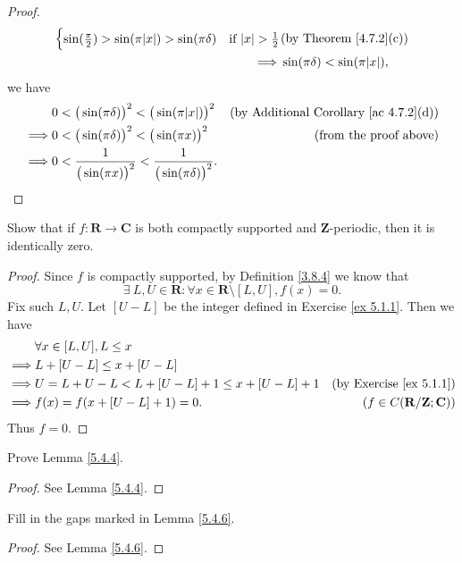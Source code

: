 \begin{proof}
\begin{align*}
\begin{cases}
                       \sin(\frac{\pi}{2}) > \sin(\pi \abs*{x}) > \sin(\pi \delta)    & \text{if } \abs*{x} > \frac{1}{2}    \\
                   \end{cases}    & \text{(by Theorem \ref{4.7.2}(c))}    \\
        \implies & \sin(\pi \delta) < \sin(\pi \abs*{x}),
    \end{align*}
    we have
    \begin{align*}
                 & 0 < \big(\sin(\pi \delta)\big)^2 < \big(\sin(\pi \abs*{x})\big)^2               & \text{(by Additional Corollary \ref{ac 4.7.2}(d))} \\
        \implies & 0 < \big(\sin(\pi \delta)\big)^2 < \big(\sin(\pi x)\big)^2                      & \text{(from the proof above)}                      \\
        \implies & 0 < \frac{1}{\big(\sin(\pi x)\big)^2} < \frac{1}{\big(\sin(\pi \delta)\big)^2}.
    \end{align*}
\end{proof}

\exercisesection

\begin{exercise}\label{ex 5.4.1}
    Show that if \(f : \mathbf{R} \to \mathbf{C}\) is both compactly supported and \(\mathbf{Z}\)-periodic, then it is identically zero.
\end{exercise}

\begin{proof}
    Since \(f\) is compactly supported, by Definition \ref{3.8.4} we know that
    \[
        \exists\ L, U \in \mathbf{R} : \forall x \in \mathbf{R} \setminus [L, U], f(x) = 0.
    \]
    Fix such \(L, U\).
    Let \([U - L]\) be the integer defined in Exercise \ref{ex 5.1.1}.
    Then we have
    \begin{align*}
                 & \forall x \in [L, U], L \leq x                                                                         \\
        \implies & L + [U - L] \leq x + [U - L]                                                                           \\
        \implies & U = L + U - L < L + [U - L] + 1 \leq x + [U - L] + 1 & \text{(by Exercise \ref{ex 5.1.1})}             \\
        \implies & f(x) = f(x + [U - L] + 1) = 0.                       & (f \in C(\mathbf{R} / \mathbf{Z} ; \mathbf{C}))
    \end{align*}
    Thus \(f = 0\).
\end{proof}

\begin{exercise}\label{ex 5.4.2}
    Prove Lemma \ref{5.4.4}.
\end{exercise}

\begin{proof}
    See Lemma \ref{5.4.4}.
\end{proof}

\begin{exercise}\label{ex 5.4.3}
    Fill in the gaps marked in Lemma \ref{5.4.6}.
\end{exercise}

\begin{proof}
    See Lemma \ref{5.4.6}.
\end{proof}